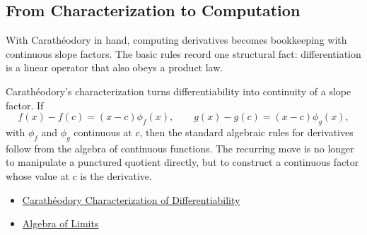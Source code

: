 \subsection{From Characterization to Computation}

\begin{remark*}[Interpretation]
With Carath\'{e}odory in hand, computing derivatives becomes bookkeeping
with continuous slope factors. The basic rules record one structural fact:
differentiation is a linear operator that also obeys a product law.
\end{remark*}

\begin{remark*}[Interpretation]
Carath\'{e}odory's characterization turns differentiability into continuity of a slope factor. If
\[
  f(x)-f(c)=(x-c)\phi_f(x),
  \qquad
  g(x)-g(c)=(x-c)\phi_g(x),
\]
with $\phi_f$ and $\phi_g$ continuous at $c$, then the standard algebraic rules for derivatives follow from the algebra of continuous functions. The recurring move is no longer to manipulate a punctured quotient directly, but to construct a continuous factor whose value at $c$ is the derivative.
\end{remark*}

\begin{dependencies}
\begin{itemize}
  \item \hyperref[thm:caratheodory-characterization-of-differentiability]{Carath\'{e}odory Characterization of Differentiability}
  \item \hyperref[thm:limit-product]{Algebra of Limits}
\end{itemize}
\end{dependencies}
